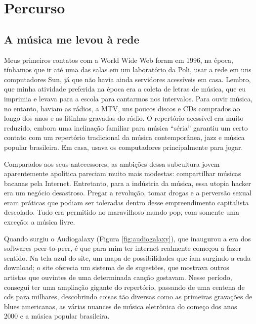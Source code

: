 
\chapter{Percurso}
\label{ch:percurso}


    \section{A música me levou à rede}
    
    Meus primeiros contatos com a World Wide Web foram em 1996, na época, tínhamos que ir até uma das salas em um laboratório da Poli, usar a rede em uns computadores Sun, já que não havia ainda servidores acessíveis em casa. Lembro, que minha atividade preferida na época era a coleta de letras de música, que eu imprimia e levava para a escola para cantarmos nos intervalos. Para ouvir música, no entanto, haviam as rádios, a MTV, uns poucos discos e CDs comprados ao longo dos anos e as fitinhas gravadas do rádio. O repertório acessível era muito reduzido, embora uma inclinação familiar para música ``séria'' garantiu um certo contato com um repertório tradicional da música contemporânea, jazz e música popular brasileira. Em casa, usava os computadores principalmente para jogar.


    \begin{citacao}
Comparados aos seus antecessores, as ambições dessa subcultura jovem aparentemente apolítica pareciam muito mais modestas: compartilhar músicas bacanas pela Internet. Entretanto, para a indústria da música, essa utopia hacker era um negócio desastroso. Pregar a revolução, tomar drogas e a perversão sexual eram práticas que podiam ser toleradas dentro desse empreendimento capitalista descolado. Tudo era permitido no maravilhoso mundo pop, com somente uma exceção: a música livre.\cite[370]{Barbrook2009}
\end{citacao}

Quando surgiu o Audiogalaxy (Figura \ref{fig:audiogalaxy}), que inaugurou a era dos softwares peer-to-peer, é que para mim ter internet realmente começou a fazer sentido. Na tela azul do site, um mapa de possibilidades que iam surgindo a cada download; o site oferecia um sistema de de sugestões, que mostrava outros artistas que ouvintes de uma determinada canção gostavam. Nesse período, consegui ter uma ampliação gigante do repertório, passando de uma centena de cds para milhares, descobrindo coisas tão diversas como as primeiras gravações de blues americanas, as várias nuances de música eletrônica do começo dos anos 2000 e a música popular brasileira. 

